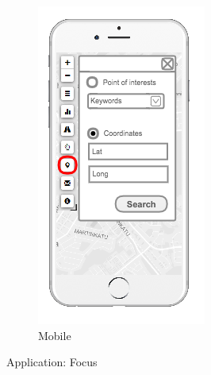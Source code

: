 \begin{figure}[ht]
\begin{subfigure}[b]{0.2\textwidth}
        \includegraphics[width=\textwidth]
          {img/c02-application/png/mobile-basemap-focus.png}
        \caption{Mobile}
    \end{subfigure}
    \caption{Application: Focus}
\end{figure}


